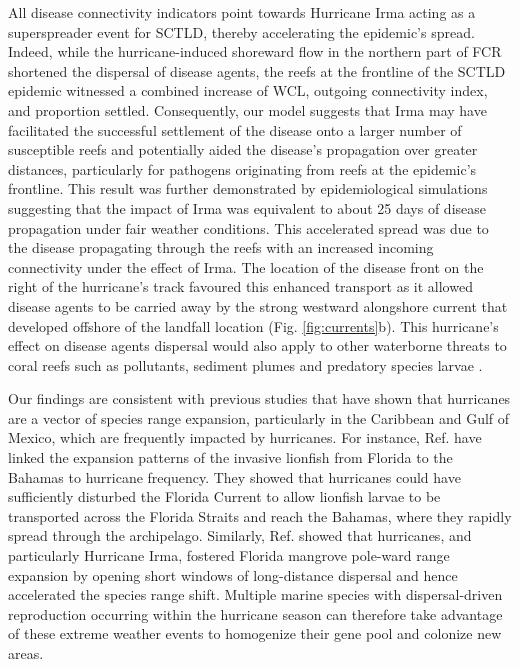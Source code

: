 \documentclass[fleqn,10pt]{wlscirep}
\newcommand{\modif}[1]{{#1}}
\begin{document}
All disease connectivity indicators point towards Hurricane Irma acting as a superspreader event for SCTLD, thereby accelerating the epidemic's spread. Indeed, while the hurricane-induced shoreward flow in the northern part of FCR shortened the dispersal of disease agents, the reefs at the frontline of the SCTLD epidemic witnessed a combined increase of WCL, outgoing connectivity index, and proportion settled. Consequently, \modif{our model suggests that Irma may have} facilitated the successful settlement of the disease onto a larger number of susceptible reefs and \modif{potentially} aided the disease's propagation over greater distances, particularly for pathogens originating from reefs at the epidemic's frontline. This result was further demonstrated by epidemiological simulations suggesting that the impact of Irma was equivalent to about 25 days of disease propagation under fair weather conditions. This accelerated spread was due to the disease propagating through the reefs with an increased incoming connectivity under the effect of Irma. The location of the disease front on the right of the hurricane's track favoured this enhanced transport as it allowed disease agents to be carried away by the strong westward alongshore current that developed offshore of the landfall location (Fig. \ref{fig:currents}b). This hurricane's effect on disease agents dispersal would also apply to other waterborne threats to coral reefs such as pollutants, sediment plumes and predatory species larvae \citep{pratchett2017thirty}.

Our findings are consistent with previous studies that have shown that hurricanes are a vector of species range expansion, particularly in the Caribbean and Gulf of Mexico, which are frequently impacted by hurricanes. For instance, Ref. \cite{Johnston2015hurricanes} have linked the expansion patterns of the invasive lionfish from Florida to the Bahamas to hurricane frequency. They showed that hurricanes could have sufficiently disturbed the Florida Current to allow lionfish larvae to be transported across the Florida Straits and reach the Bahamas, where they rapidly spread through the archipelago. Similarly, Ref. \cite{kennedy2020hurricanes} showed that hurricanes, and particularly Hurricane Irma, fostered Florida mangrove pole-ward range expansion by opening short windows of long-distance dispersal and hence accelerated the species range shift.  Multiple marine species with dispersal-driven reproduction occurring within the hurricane season can therefore take advantage of these extreme weather events to homogenize their gene pool and colonize new areas.
\end{document}
